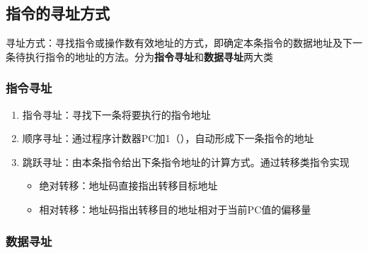 \documentclass[./computer-organization-and-architecture.tex]{subfiles}
\begin{document}
    \subsection{指令的寻址方式}

    寻址方式：寻找指令或操作数有效地址的方式，即确定本条指令的数据地址及下一条待执行指令的地址的方法。分为\textbf{指令寻址}和\textbf{数据寻址}两大类

    \subsubsection{指令寻址}

    \begin{enumerate}
        \item 指令寻址：寻找下一条将要执行的指令地址
        \item 顺序寻址：通过程序计数器PC加1（{\color{red}{1条指令的长度}}），自动形成下一条指令的地址
        \item 跳跃寻址：由本条指令给出下条指令地址的计算方式。通过转移类指令实现
        \begin{itemize}
            \item 绝对转移：地址码直接指出转移目标地址
            \item 相对转移：地址码指出转移目的地址相对于当前PC值的偏移量
        \end{itemize}
    \end{enumerate}

    \subsubsection{数据寻址}
\end{document}
